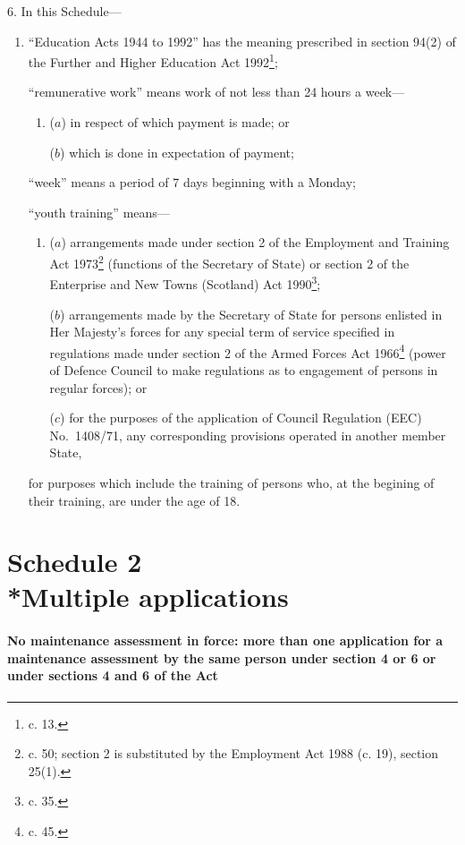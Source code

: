 \documentclass[a4paper]{article}
\newcommand{\parthead}{}
\begin{document}
6.  In this Schedule—
\begin{enumerate}\item[]
“Education Acts 1944 to 1992” has the meaning prescribed in section 94(2) of the Further and Higher Education Act 1992\footnote{ c. 13.};

“remunerative work” means work of not less than 24 hours a week—
\begin{enumerate}\item[]
($a$) in respect of which payment is made; or

($b$) which is done in expectation of payment;
\end{enumerate}

“week” means a period of 7 days beginning with a Monday;

“youth training” means—
\begin{enumerate}\item[]
($a$) arrangements made under section 2 of the Employment and Training Act 1973\footnote{ c. 50; section 2 is substituted by the Employment Act 1988 (c. 19), section 25(1).} (functions of the Secretary of State) or section 2 of the Enterprise and New Towns (Scotland) Act 1990\footnote{ c. 35.};

($b$) arrangements made by the Secretary of State for persons enlisted in Her Majesty’s forces for any special term of service specified in regulations made under section 2 of the Armed Forces Act 1966\footnote{ c. 45.} (power of Defence Council to make regulations as to engagement of persons in regular forces); or

($c$) for the purposes of the application of Council Regulation (EEC) No.\ 1408/71, any corresponding provisions operated in another member State,
\end{enumerate}
for purposes which include the training of persons who, at the begining of their training, are under the age of 18.
\end{enumerate}

\part[Schedule 2 --- Multiple applications]{Schedule 2\\*Multiple applications}

\renewcommand\parthead{--- Schedule 2}

\subsection*{No maintenance assessment in force: more than one application for a maintenance assessment by the same person under section 4 or 6 or under sections 4 and 6 of the Act}
\end{document}

